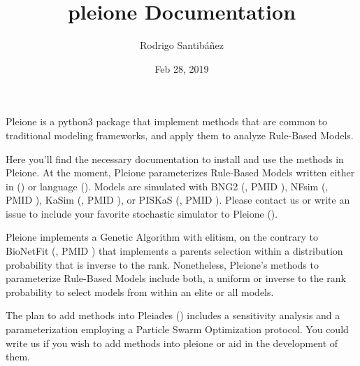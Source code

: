 \documentclass[letterpaper,10pt,english]{sphinxmanual}
\title{pleione Documentation}
\date{Feb 28, 2019}
\author{Rodrigo Santibáñez}
\begin{document}
\pagestyle{empty}
\sphinxmaketitle
\pagestyle{plain}
\sphinxtableofcontents
\pagestyle{normal}
\label{\detokenize{index::doc}}


Pleione is a python3 package that implement methods that are common to
traditional modeling frameworks, and apply them to analyze Rule-Based Models.

Here you’ll find the necessary documentation to install and use the methods in
Pleione. At the moment, Pleione parameterizes Rule-Based Models written
either in  () or  language (). Models are
simulated with BNG2 (, PMID ), NFsim (, PMID ), KaSim (, PMID ), or
PISKaS (, PMID ). Please contact us or write an issue to include your
favorite stochastic simulator to Pleione ().

Pleione implements a Genetic Algorithm with elitism, on the
contrary to BioNetFit (, PMID ) that implements a parents selection within
a distribution probability that is inverse to the rank. Nonetheless, Pleione’s
methods to parameterize Rule-Based Models include both, a uniform or inverse to the rank
probability to select models from within an elite or all models.

The plan to add methods into Pleiades () includes a sensitivity analysis and a
parameterization employing a Particle Swarm Optimization protocol. You
could write us if you wish to add methods into pleione or aid in the development
of them.
\end{document}

